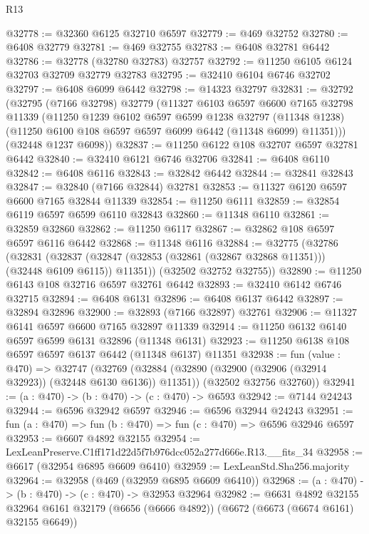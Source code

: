 \begin{lexlean}{R13}
\begin{coremodule}
@32778 := @32360 @6125 @32710 @6597
@32779 := @469 @32752
@32780 := @6408 @32779
@32781 := @469 @32755
@32783 := @6408 @32781 @6442
@32786 := @32778 (@32780 @32783) @32757
@32792 := @11250 @6105 @6124 @32703 @32709 @32779 @32783
@32795 := @32410 @6104 @6746 @32702
@32797 := @6408 @6099 @6442
@32798 := @14323 @32797
@32831 := @32792
    (@32795
      (@7166 @32798)
      @32779
      (@11327
        @6103
        @6597
        @6600
        @7165
        @32798
        @11339
        (@11250
          @1239
          @6102
          @6597
          @6599
          @1238
          @32797
          (@11348 @1238)
          (@11250 @6100 @108 @6597 @6597 @6099 @6442 (@11348 @6099) @11351)))
      (@32448 @1237 @6098))
@32837 := @11250 @6122 @108 @32707 @6597 @32781 @6442
@32840 := @32410 @6121 @6746 @32706
@32841 := @6408 @6110
@32842 := @6408 @6116
@32843 := @32842 @6442
@32844 := @32841 @32843
@32847 := @32840 (@7166 @32844) @32781
@32853 := @11327 @6120 @6597 @6600 @7165 @32844 @11339
@32854 := @11250 @6111
@32859 := @32854 @6119 @6597 @6599 @6110 @32843
@32860 := @11348 @6110
@32861 := @32859 @32860
@32862 := @11250 @6117
@32867 := @32862 @108 @6597 @6597 @6116 @6442
@32868 := @11348 @6116
@32884 := @32775
    (@32786
      (@32831
        (@32837 (@32847 (@32853 (@32861 (@32867 @32868 @11351))) (@32448 @6109 @6115)) @11351))
      (@32502 @32752 @32755))
@32890 := @11250 @6143 @108 @32716 @6597 @32761 @6442
@32893 := @32410 @6142 @6746 @32715
@32894 := @6408 @6131
@32896 := @6408 @6137 @6442
@32897 := @32894 @32896
@32900 := @32893 (@7166 @32897) @32761
@32906 := @11327 @6141 @6597 @6600 @7165 @32897 @11339
@32914 := @11250 @6132 @6140 @6597 @6599 @6131 @32896 (@11348 @6131)
@32923 := @11250 @6138 @108 @6597 @6597 @6137 @6442 (@11348 @6137) @11351
@32938 := fun (value : @470) =>
  @32747
    (@32769
      (@32884 (@32890 (@32900 (@32906 (@32914 @32923)) (@32448 @6130 @6136)) @11351))
      (@32502 @32756 @32760))
@32941 := (a : @470) -> (b : @470) -> (c : @470) -> @6593
@32942 := @7144 @24243
@32944 := @6596 @32942 @6597
@32946 := @6596 @32944 @24243
@32951 := fun (a : @470) => fun (b : @470) => fun (c : @470) => @6596 @32946 @6597
@32953 := @6607 @4892 @32155
@32954 := LexLeanPreserve.C1ff171d22d5f7b976dcc052a277d666e.R13.__fits_34
@32958 := @6617 (@32954 @6895 @6609 @6410)
@32959 := LexLeanStd.Sha256.majority
@32964 := @32958 (@469 (@32959 @6895 @6609 @6410))
@32968 := (a : @470) -> (b : @470) -> (c : @470) -> @32953 @32964
@32982 := @6631
    @4892
    @32155
    @32964
    @6161
    @32179
    (@6656 (@6666 @4892))
    (@6672 (@6673 (@6674 @6161) @32155 @6649))

\end{coremodule}
\end{lexlean}
